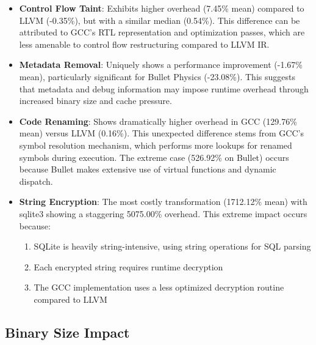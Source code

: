\documentclass[conference]{IEEEtran}
\begin{document}
\begin{itemize}
    \item \textbf{Control Flow Taint}: Exhibits higher overhead (7.45\% mean) compared to LLVM (-0.35\%), but with a similar median (0.54\%). This difference can be attributed to GCC's RTL representation and optimization passes, which are less amenable to control flow restructuring compared to LLVM IR.
    
    \item \textbf{Metadata Removal}: Uniquely shows a performance improvement (-1.67\% mean), particularly significant for Bullet Physics (-23.08\%). This suggests that metadata and debug information may impose runtime overhead through increased binary size and cache pressure.
    
    \item \textbf{Code Renaming}: Shows dramatically higher overhead in GCC (129.76\% mean) versus LLVM (0.16\%). This unexpected difference stems from GCC's symbol resolution mechanism, which performs more lookups for renamed symbols during execution. The extreme case (526.92\% on Bullet) occurs because Bullet makes extensive use of virtual functions and dynamic dispatch.
    
    \item \textbf{String Encryption}: The most costly transformation (1712.12\% mean) with sqlite3 showing a staggering 5075.00\% overhead. This extreme impact occurs because:
    \begin{enumerate}
        \item SQLite is heavily string-intensive, using string operations for SQL parsing
        \item Each encrypted string requires runtime decryption
        \item The GCC implementation uses a less optimized decryption routine compared to LLVM
    \end{enumerate}
\end{itemize}

\subsection{Binary Size Impact}
\end{document}
